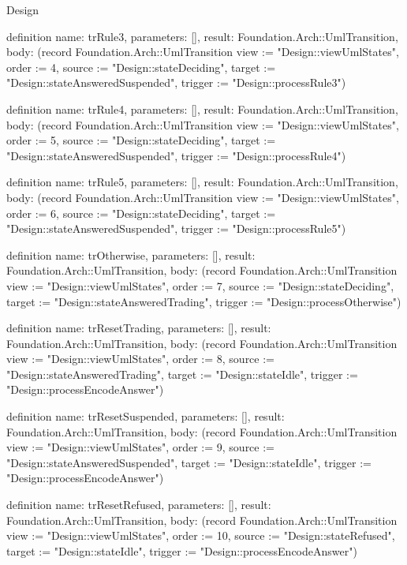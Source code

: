 \begin{lexlean}{Design}
\begin{semanticmodule}
definition{
  name: trRule3,
  parameters: [],
  result: Foundation.Arch::UmlTransition,
  body: (record Foundation.Arch::UmlTransition {view := "Design::viewUmlStates", order := 4, source := "Design::stateDeciding", target := "Design::stateAnsweredSuspended", trigger := "Design::processRule3"})
}

definition{
  name: trRule4,
  parameters: [],
  result: Foundation.Arch::UmlTransition,
  body: (record Foundation.Arch::UmlTransition {view := "Design::viewUmlStates", order := 5, source := "Design::stateDeciding", target := "Design::stateAnsweredSuspended", trigger := "Design::processRule4"})
}

definition{
  name: trRule5,
  parameters: [],
  result: Foundation.Arch::UmlTransition,
  body: (record Foundation.Arch::UmlTransition {view := "Design::viewUmlStates", order := 6, source := "Design::stateDeciding", target := "Design::stateAnsweredSuspended", trigger := "Design::processRule5"})
}

definition{
  name: trOtherwise,
  parameters: [],
  result: Foundation.Arch::UmlTransition,
  body: (record Foundation.Arch::UmlTransition {view := "Design::viewUmlStates", order := 7, source := "Design::stateDeciding", target := "Design::stateAnsweredTrading", trigger := "Design::processOtherwise"})
}

definition{
  name: trResetTrading,
  parameters: [],
  result: Foundation.Arch::UmlTransition,
  body: (record Foundation.Arch::UmlTransition {view := "Design::viewUmlStates", order := 8, source := "Design::stateAnsweredTrading", target := "Design::stateIdle", trigger := "Design::processEncodeAnswer"})
}

definition{
  name: trResetSuspended,
  parameters: [],
  result: Foundation.Arch::UmlTransition,
  body: (record Foundation.Arch::UmlTransition {view := "Design::viewUmlStates", order := 9, source := "Design::stateAnsweredSuspended", target := "Design::stateIdle", trigger := "Design::processEncodeAnswer"})
}

definition{
  name: trResetRefused,
  parameters: [],
  result: Foundation.Arch::UmlTransition,
  body: (record Foundation.Arch::UmlTransition {view := "Design::viewUmlStates", order := 10, source := "Design::stateRefused", target := "Design::stateIdle", trigger := "Design::processEncodeAnswer"})
}
\end{semanticmodule}
\end{lexlean}
